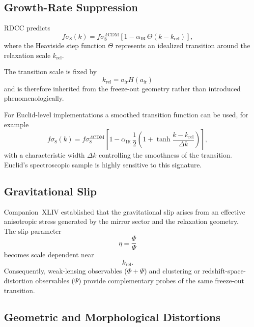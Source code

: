 \documentclass[11pt,a4paper]{article}
\begin{document}
\subsection{Growth-Rate Suppression}

RDCC predicts
\begin{equation}
  f\sigma_8(k)
  =
  f\sigma_8^{\Lambda\mathrm{CDM}}
  \left[
    1 - \alpha_{\mathrm{IR}}\, \Theta(k - k_{\mathrm{rel}})
  \right],
\end{equation}
where the Heaviside step function \(\Theta\) represents an idealized
transition around the relaxation scale \(k_{\mathrm{rel}}\).

The transition scale is fixed by
\begin{equation}
  k_{\mathrm{rel}}
  =
  a_{\mathrm{fr}} H(a_{\mathrm{fr}})
\end{equation}
and is therefore inherited from the freeze-out geometry rather than
introduced phenomenologically.

For Euclid-level implementations a smoothed transition function can be used,
for example
\begin{equation}
  f\sigma_8(k)
  =
  f\sigma_8^{\Lambda\mathrm{CDM}}
  \left[
    1
    -
    \alpha_{\mathrm{IR}}\,
    \frac{1}{2}
    \left(
      1 + \tanh\frac{k - k_{\mathrm{rel}}}{\Delta k}
    \right)
  \right],
\end{equation}
with a characteristic width \(\Delta k\) controlling the smoothness of the
transition. Euclid's spectroscopic sample is highly sensitive to this
signature.

\subsection{Gravitational Slip}

Companion~XLIV established that the gravitational slip arises from an
effective anisotropic stress generated by the mirror sector and the
relaxation geometry. The slip parameter
\begin{equation}
  \eta
  =
  \frac{\Phi}{\Psi}
\end{equation}
becomes scale dependent near
\begin{equation}
  k_{\mathrm{rel}}.
\end{equation}
Consequently, weak-lensing observables (\(\Phi+\Psi\)) and clustering or
redshift-space-distortion observables (\(\Psi\)) provide complementary
probes of the same freeze-out transition.

\subsection{Geometric and Morphological Distortions}
\end{document}
